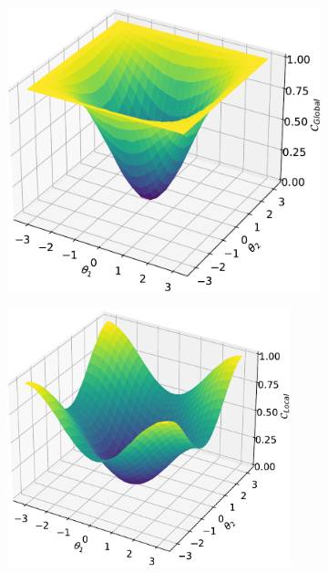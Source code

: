 \documentclass[%
 reprint,
 amsmath,
 amssymb,
 showkeys,
 pra,
 floatfix,
]{revtex4-2}
\begin{document}
\begin{figure}[t]
    \centering
    \begin{subfigure}[b]{0.48\textwidth}
    \begin{minipage}
    {.03\textwidth}
        \caption{}
        \label{fig:barren-plateau-1}
    \end{minipage}%
    \begin{minipage}{0.90\textwidth}
        \includegraphics[width=.9\textwidth]{images/global_cost_loss_landscape.pdf}
    \end{minipage}
    \end{subfigure}
    \begin{subfigure}[b]{0.48\linewidth}
    \begin{minipage}{.08\textwidth}
        \caption{}
        \label{fig:barren-plateau-2}
    \end{minipage}%
    \begin{minipage}{0.9\textwidth}
        \includegraphics[width=0.9\textwidth]{images/local_cost_loss_landscape.pdf}

\end{minipage}
\end{subfigure}
\end{figure}
\end{document}
